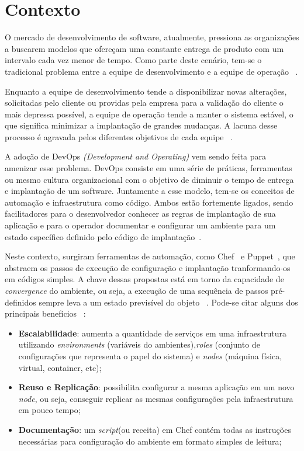 \section{Contexto}
\label{sec:contexto}

O mercado de desenvolvimento de software, atualmente, pressiona as organizações
a buscarem modelos que ofereçam uma constante entrega de produto com
um intervalo cada vez menor de tempo. Como parte deste cenário, tem-se o
tradicional problema entre a equipe de desenvolvimento e a equipe de operação
~\cite{hummer:2013}.

Enquanto a equipe de desenvolvimento tende a disponibilizar novas alterações,
solicitadas pelo cliente ou providas pela empresa para a validação do cliente o
mais depressa possível, a equipe de operação tende a manter o sistema estável,
o que significa minimizar a implantação de grandes mudanças. A lacuna desse
processo é agravada pelos diferentes objetivos de cada equipe
~\cite{huttermann:2012}.

A adoção de DevOps \textit{(Development and Operating)} vem sendo feita
para amenizar esse problema. DevOps consiste em uma série de práticas,
ferramentas ou mesmo cultura organizacional com o objetivo de diminuir o tempo
de entrega e implantação de um software. Juntamente a esse modelo,
tem-se os conceitos de automação e infraestrutura
como código. Ambos estão fortemente ligados, sendo facilitadores para o
desenvolvedor conhecer as regras de implantação de sua aplicação
e para o operador documentar e configurar um ambiente para um estado específico
definido pelo código de implantação~\cite{hummer:2013}.

Neste contexto, surgiram ferramentas de automação, como Chef~\cite{chef:2016} e
Puppet~\cite{puppet:2016}, que abstraem os passos de execução de configuração
e implantação tranformando-os em códigos simples. A chave dessas propostas está em torno
da capacidade de \textit{convergence} do ambiente, ou seja, a execução de uma
sequência de passos pré-definidos sempre leva a um estado previsível do objeto
~\cite{hummer:2013}. Pode-se citar alguns dos principais benefícios
~\cite{vasiliev:2014}:

\begin{itemize}
  \item \textbf{Escalabilidade}: aumenta a quantidade de serviços em uma infraestrutura
    utilizando \textit{environments} (variáveis do ambientes),\textit{roles}
    (conjunto de configurações que representa o papel do sistema) e \textit{nodes}
    (máquina física, virtual, container, etc);
  \item \textbf{Reuso e Replicação}: possibilita configurar a mesma aplicação em um novo \textit{node}, ou seja,
    conseguir replicar as mesmas configurações pela infraestrutura em pouco tempo;
  \item \textbf{Documentação}: um \textit{script}(ou receita) em Chef contém todas as instruções necessárias
    para configuração do ambiente em formato simples de leitura;
\end{itemize}

